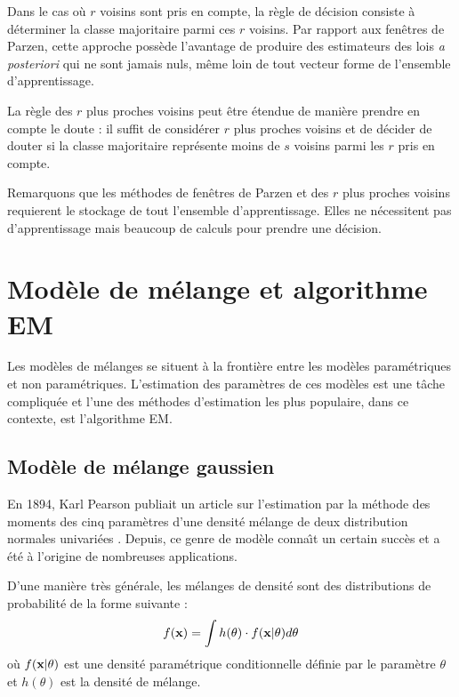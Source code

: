 Dans le cas o\`u $r$ voisins sont pris en compte, la r\`egle de d\'ecision 
consiste \`a d\'eterminer la classe majoritaire parmi ces $r$ voisins.
Par rapport aux fen\^etres de Parzen, cette approche poss\`ede l'avantage
de produire des estimateurs des lois {\em a posteriori} qui ne sont jamais nuls,
m\^eme loin de tout vecteur forme de l'ensemble d'apprentissage.

La r\`egle des $r$ plus proches voisins peut \^etre \'etendue de mani\`ere
prendre en compte le doute \cite{Hellman1970} : il suffit de consid\'erer $r$ plus proches 
voisins et de d\'ecider de douter  si la classe majoritaire repr\'esente moins 
de $s$ voisins parmi les $r$ pris en compte.

Remarquons que les m\'ethodes de fen\^etres de Parzen et des $r$ plus
proches voisins requierent le stockage de tout l'ensemble d'apprentissage.
Elles ne n\'ecessitent pas d'apprentissage mais beaucoup de calculs
pour prendre une d\'ecision.  




\section{Mod\`ele de m\'elange et algorithme EM}

Les mod\`eles de m\'elanges se situent \`a la fronti\`ere entre les 
mod\`eles param\'etriques et non param\'etriques. L'estimation des
param\`etres de ces mod\`eles est une t\^ache compliqu\'ee et  l'une
des m\'ethodes d'estimation les plus populaire, dans ce contexte,  est 
l'algorithme EM. 


\subsection{Mod\`ele de m\'elange gaussien}
En 1894, Karl Pearson publiait un article sur l'estimation
par la m\'ethode des moments des cinq param\`etres d'une
densit\'e m\'elange de deux distribution normales univari\'ees
\cite{Pearson1894}.
Depuis, ce genre de mod\`ele conna\^\i t un certain succ\`es et
a \'et\'e \`a l'origine de nombreuses applications. 
  
D'une mani\`ere tr\`es g\'en\'erale, les m\'elanges de densit\'e
sont des distributions de probabilit\'e de la forme suivante :
\begin{equation}
f(\mbox{\bf x})=\int h(\theta)\cdot f(\mbox{\bf x} | \theta) d\theta
\end{equation}
o\`u $f(\mbox{\bf x} | \theta)$ est une densit\'e param\'etrique conditionnelle
d\'efinie par le param\`etre $\theta$ et $h(\theta)$ est la densit\'e
de m\'elange.

